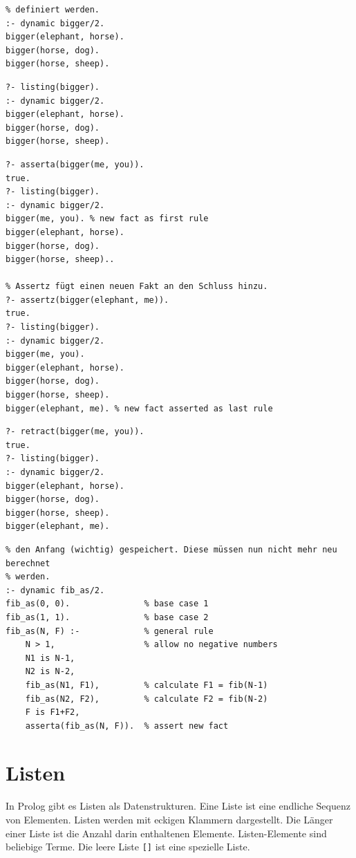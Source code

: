 \begin{lstlisting}[caption=dynamic/1]
% Damit Prädikate zur Laufzeit modifiziert werden können, müssen diese mit dynamic
% definiert werden.
:- dynamic bigger/2.
bigger(elephant, horse).
bigger(horse, dog).
bigger(horse, sheep).
\end{lstlisting}

\begin{lstlisting}[caption=listing/1]
% Mittels listing können die Fakten und Regel zu einem Prädikat angezeigt werden.
?- listing(bigger).
:- dynamic bigger/2.
bigger(elephant, horse).
bigger(horse, dog).
bigger(horse, sheep).
\end{lstlisting}

\begin{lstlisting}[caption=asserta/1 \& assertz/1]
% Asserta fügt einen neuen Fakt an den Beginn hinzu.
?- asserta(bigger(me, you)).
true.
?- listing(bigger).
:- dynamic bigger/2.
bigger(me, you). % new fact as first rule
bigger(elephant, horse).
bigger(horse, dog).
bigger(horse, sheep)..

% Assertz fügt einen neuen Fakt an den Schluss hinzu.
?- assertz(bigger(elephant, me)).
true.
?- listing(bigger).
:- dynamic bigger/2.
bigger(me, you).
bigger(elephant, horse).
bigger(horse, dog).
bigger(horse, sheep).
bigger(elephant, me). % new fact asserted as last rule
\end{lstlisting}

\begin{lstlisting}[caption=retract/1]
% Mittels retract können Fakten/Regeln entfernt werden.
?- retract(bigger(me, you)).
true.
?- listing(bigger).
:- dynamic bigger/2.
bigger(elephant, horse).
bigger(horse, dog).
bigger(horse, sheep).
bigger(elephant, me).
\end{lstlisting}

\begin{lstlisting}[caption=Naive Fibonnaci optimiert mit Assertions]
% Nach jeder Berechnung einer Fibonacci Zahl wird diese in die Wissensdatenbank an 
% den Anfang (wichtig) gespeichert. Diese müssen nun nicht mehr neu berechnet 
% werden.
:- dynamic fib_as/2.
fib_as(0, 0). 				% base case 1
fib_as(1, 1). 				% base case 2
fib_as(N, F) :- 			% general rule
	N > 1, 					% allow no negative numbers
	N1 is N-1, 
	N2 is N-2,
	fib_as(N1, F1), 		% calculate F1 = fib(N-1)
	fib_as(N2, F2), 		% calculate F2 = fib(N-2)
	F is F1+F2,
	asserta(fib_as(N, F)). 	% assert new fact
\end{lstlisting}

\section{Listen}
In Prolog gibt es Listen als Datenstrukturen. Eine Liste ist eine endliche Sequenz von Elementen. Listen werden mit eckigen Klammern dargestellt. Die Länger einer Liste ist die Anzahl darin enthaltenen Elemente. Listen-Elemente sind beliebige Terme. Die leere Liste \verb|[]| ist eine spezielle Liste.


